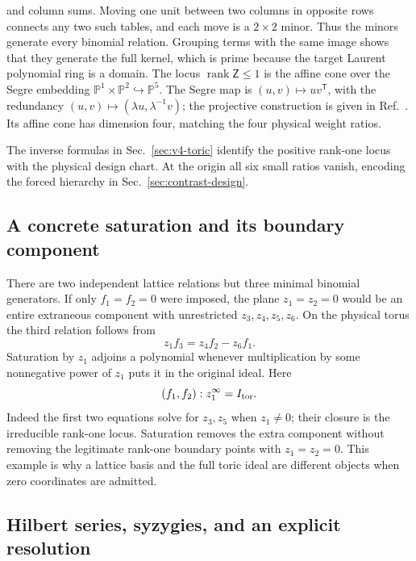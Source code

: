 \documentclass[aps,pre,reprint,amsmath,amssymb,longbibliography]{revtex4-2}
\begin{document}
and column sums. Moving one unit between two columns in opposite rows
connects any two such tables, and each move is a $2\times2$ minor.
Thus the minors generate every binomial relation. Grouping terms with
the same image shows that they generate the full kernel, which is prime
because the target Laurent polynomial ring is a domain.
The locus $\operatorname{rank}\mathsf Z\le1$ is the affine cone over the Segre
embedding $\mathbb P^1\times\mathbb P^2\hookrightarrow\mathbb P^5$.
The Segre map is $(u,v)\mapsto u v^{\mathsf T}$, with the redundancy
$(u,v)\mapsto(\lambda u,\lambda^{-1}v)$; the projective construction is
given in Ref.~\cite{MathStacksSegre}. Its affine cone has dimension four,
matching the four physical weight ratios.

The inverse formulas in Sec.~\ref{sec:v4-toric} identify the positive
rank-one locus with the physical design chart. At the origin all six
small ratios vanish, encoding the forced hierarchy in
Sec.~\ref{sec:contrast-design}.

\subsection{A concrete saturation and its boundary component}
\label{v4:alg:toric-saturation}

There are two independent lattice relations but three minimal binomial
generators. If only $f_1=f_2=0$ were imposed, the plane $z_1=z_2=0$
would be an entire extraneous component with unrestricted $z_3,z_4,z_5,z_6$.
On the physical torus the third relation follows from
\begin{equation}
 z_1f_3=z_4f_2-z_6f_1.
 \label{v4:alg:toric-saturation-identity}
\end{equation}
Saturation by $z_1$ adjoins a polynomial whenever multiplication by
some nonnegative power of $z_1$ puts it in the original ideal. Here
\begin{equation}
 (f_1,f_2):z_1^\infty=I_{\rm tor}.
 \label{v4:alg:toric-saturation-eq}
\end{equation}
Indeed the first two equations solve for $z_3,z_5$ when $z_1\ne0$;
their closure is the irreducible rank-one locus. Saturation removes the
extra component without removing the legitimate rank-one boundary points
with $z_1=z_2=0$. This example is why a lattice basis and the full toric
ideal are different objects when zero coordinates are admitted.

\subsection{Hilbert series, syzygies, and an explicit resolution}
\label{v4:alg:toric-hilbert}
\end{document}
